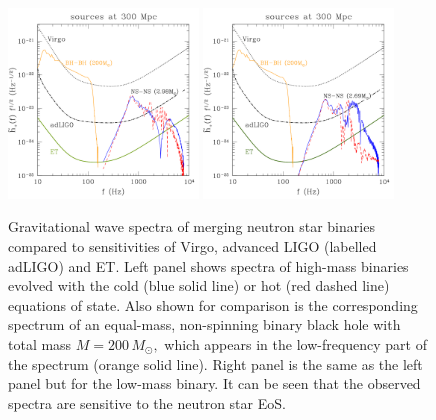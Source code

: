 \begin{figure}
\begin{center}
\includegraphics[angle=-0,width=0.45\textwidth]{./Sec_ET_ScienceCase/highmass-NS.pdf}
\hskip 0.2cm
\includegraphics[angle=-0,width=0.45\textwidth]{./Sec_ET_ScienceCase/lowmass-NS.pdf}
\caption{
Gravitational wave spectra of merging neutron star binaries compared to
sensitivities of Virgo, advanced LIGO (labelled adLIGO) and ET. 
Left panel shows spectra of high-mass binaries evolved with the cold 
(blue solid line) or hot (red dashed line) equations of state. Also
shown for comparison is the corresponding spectrum of an equal-mass, 
non-spinning binary black hole with total mass $M=200\,M_\odot,$
which appears in the low-frequency part of the spectrum (orange solid 
line). Right panel is the same as the left panel but for the 
low-mass binary.  It can be seen that the observed spectra are 
sensitive to the neutron star EoS.
\label{NS_example}}
\end{center}
\end{figure}


